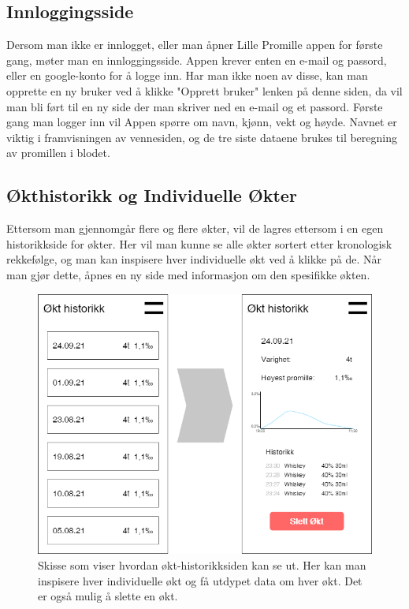 \documentclass[12pt]{article}
\begin{document}
\subsection{Innloggingsside}
Dersom man ikke er innlogget, eller man åpner Lille Promille appen for første gang, møter man en innloggingsside. Appen krever enten en e-mail og passord, eller en google-konto for å logge inn. Har man ikke noen av disse, kan man opprette en ny bruker ved å klikke "Opprett bruker" lenken på denne siden, da vil man bli ført til en ny side der man skriver ned en e-mail og et passord. Første gang man logger inn vil Appen spørre om navn, kjønn, vekt og høyde. Navnet er viktig i framvisningen av vennesiden, og de tre siste dataene brukes til beregning av promillen i blodet.

\subsection{Økthistorikk og Individuelle Økter}
Ettersom man gjennomgår flere og flere økter, vil de lagres ettersom i en egen historikkside for økter. Her vil man kunne se alle økter sortert etter kronologisk rekkefølge, og man kan inspisere hver individuelle økt ved å klikke på de. Når man gjør dette, åpnes en ny side med informasjon om den spesifikke økten.

\begin{figure}[H]
    \centering
    \includegraphics[scale=0.4]{images/lille_promille_sessions.drawio.png}
    \caption{Skisse som viser hvordan økt-historikksiden kan se ut. Her kan man inspisere hver individuelle økt og få utdypet data om hver økt. Det er også mulig å slette en økt.}
\end{figure}
\end{document}
